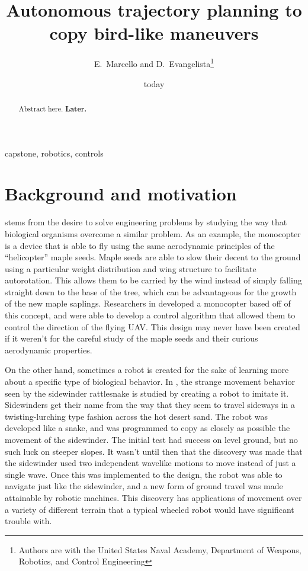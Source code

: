 \documentclass[onecolumn,10pt]{IEEEtran}
\title{Autonomous trajectory planning to copy bird-like maneuvers}
\author{E.~Marcello and D.~Evangelista\thanks{Authors are with the United States Naval Academy, Department of Weapons, Robotics, and Control Engineering}}
\date{today}
\newcommand{\Later}{\textbf{Later.}}
\begin{document}
\maketitle

\begin{abstract}
Abstract here. \Later
\end{abstract}

\begin{IEEEkeywords}
capstone, robotics, controls
\end{IEEEkeywords}

\section{Background and motivation}
 stems from the desire to solve engineering problems by studying the way that biological organisms overcome a similar problem. As an example, the monocopter is a device that is able to fly using the same aerodynamic principles of the “helicopter” maple seeds. Maple seeds are able to slow their decent to the ground using a particular weight distribution and wing structure to facilitate autorotation. This allows them to be carried by the wind instead of simply falling straight down to the base of the tree, which can be advantageous for the growth of the new maple saplings. Researchers in \cite{who2019maple} developed a monocopter based off of this concept, and were able to develop a control algorithm that allowed them to control the direction of the flying UAV. This design may never have been created if it weren’t for the careful study of the maple seeds and their curious aerodynamic properties. 

On the other hand, sometimes a robot is created for the sake of learning more about a specific type of biological behavior. In \cite{feltman2014creepy}, the strange movement behavior seen by the sidewinder rattlesnake is studied by creating a robot to imitate it. Sidewinders get their name from the way that they seem to travel sideways in a twisting-lurching type fashion across the hot desert sand. The robot was developed like a snake, and was programmed to copy as closely as possible the movement of the sidewinder. The initial test had success on level ground, but no such luck on steeper slopes. It wasn’t until then that the discovery was made that the sidewinder used two independent wavelike motions to move instead of just a single wave. Once this was implemented to the design, the robot was able to navigate just like the sidewinder, and a new form of ground travel was made attainable by robotic machines. This discovery has applications of movement over a variety of different terrain that a typical wheeled robot would have significant trouble with.
\end{document}
